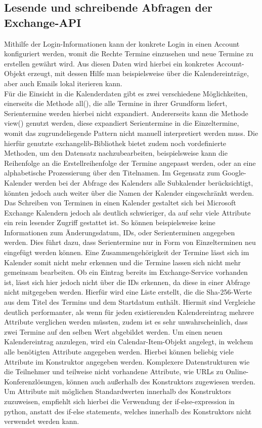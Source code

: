 \subsection{Lesende und schreibende Abfragen der Exchange-API}
Mithilfe der Login-Informationen kann der konkrete Login in einen Account konfiguriert werden, womit die Rechte Termine einzusehen und neue Termine zu erstellen gewährt wird. Aus diesen Daten wird hierbei ein konkretes Account-Objekt erzeugt, mit dessen Hilfe man beispielsweise über die Kalendereinträge, aber auch Emails lokal iterieren kann. \\
Für die Einsicht in die Kalenderdaten gibt es zwei verschiedene Möglichkeiten, einerseits die Methode all(), die alle Termine in ihrer Grundform liefert, Serientermine werden hierbei nicht expandiert. Andererseits kann die Methode view() genutzt werden, diese expandiert Serientermine in die Einzeltermine, womit das zugrundeliegende Pattern nicht manuell interpretiert werden muss. Die hierfür genutzte exchangelib-Bibliothek bietet zudem noch vordefinierte Methoden, um den Datensatz nachzubearbeiten, beispielsweise kann die Reihenfolge an die Erstellreihenfolge der Termine angepasst werden, oder an eine alphabetische Prozessierung über den Titelnamen. Im Gegensatz zum Google-Kalender werden bei der Abfrage des Kalenders alle Subkalender berücksichtigt, könnten jedoch auch weiter über die Namen der Kalender eingeschränkt werden.\\
Das Schreiben von Terminen in einen Kalender gestaltet sich bei Microsoft Exchange Kalendern jedoch als deutlich schwieriger, da auf sehr viele Attribute ein rein lesender Zugriff gestattet ist. So können beispielsweise keine Informationen zum Änderungsdatum, IDs, oder Serienterminen angegeben werden. Dies führt dazu, dass Serientermine nur in Form von Einzelterminen neu eingefügt werden können. Eine Zusammengehörigkeit der Termine lässt sich im Kalender somit nicht mehr erkennen und die Termine lassen sich nicht mehr gemeinsam bearbeiten. Ob ein Eintrag bereits im Exchange-Service vorhanden ist, lässt sich hier jedoch nicht über die IDs erkennen, da diese in einer Abfrage nicht mitgegeben werden. Hierfür wird eine Liste erstellt, die die Sha-256-Werte aus dem Titel des Termins und dem Startdatum enthält. Hiermit sind Vergleiche deutlich performanter, als wenn für jeden existierenden Kalendereintrag mehrere Attribute verglichen werden müssten, zudem ist es sehr unwahrscheinlich, dass zwei Termine auf den selben Wert abgebildet werden. Um einen neuen Kalendereintrag anzulegen, wird ein Calendar-Item-Objekt angelegt, in welchem alle benötigten Attribute angegeben werden. Hierbei können beliebig viele Attribute im Konstruktor angegeben werden. Komplexere Datenstrukturen wie die Teilnehmer und teilweise nicht vorhandene Attribute, wie URLs zu Online-Konferenzlösungen, können auch außerhalb des Konstruktors zugewiesen werden. Um Attribute mit möglichen Standardwerten innerhalb des Konstruktors zuzuweisen, empfiehlt sich hierbei die Verwendung der if-else-expression in python, anstatt des if-else statements, welches innerhalb des Konstruktors nicht verwendet werden kann.
